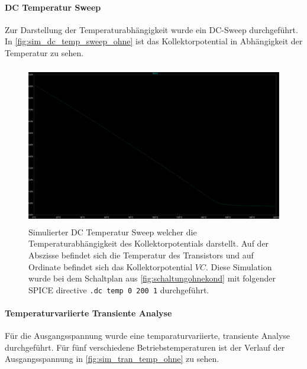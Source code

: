 \documentclass[12pt,english,ngerman]{scrartcl}
\begin{document}
\paragraph{DC Temperatur Sweep}
Zur Darstellung der Temperaturabhängigkeit wurde ein DC-Sweep durchgeführt. In \autoref{fig:sim_dc_temp_sweep_ohne} ist das Kollektorpotential in Abhängigkeit der Temperatur zu sehen.
\begin{figure}[H]
  \centering
    \includegraphics[width=\linewidth, height=7cm]{./figures/ohnekond/tempsweepdclinear.png }
    \caption[Simulierter DC Temperatur Sweep ohne
    Überbrückungskondensator]{Simulierter DC Temperatur Sweep welcher die
      Temperaturabhängigkeit des Kollektorpotentials darstellt. Auf der
      Abszisse befindet sich die Temperatur des Transistors und auf Ordinate
      befindet sich das Kollektorpotential $VC$. Diese Simulation wurde bei dem
      Schaltplan aus \autoref{fig:schaltungohnekond} mit folgender SPICE
      directive \texttt{.dc temp 0 200 1} durchgeführt.
  }
  \label{fig:sim_dc_temp_sweep_ohne}
\end{figure}


\paragraph{Temperaturvariierte Transiente Analyse}
Für die Ausgangsspannung wurde eine temparaturvariierte, transiente Analyse durchgeführt. Für fünf verschiedene Betriebstemperaturen ist der Verlauf der Ausgangsspannung in \autoref{fig:sim_tran_temp_ohne} zu sehen.
\end{document}
